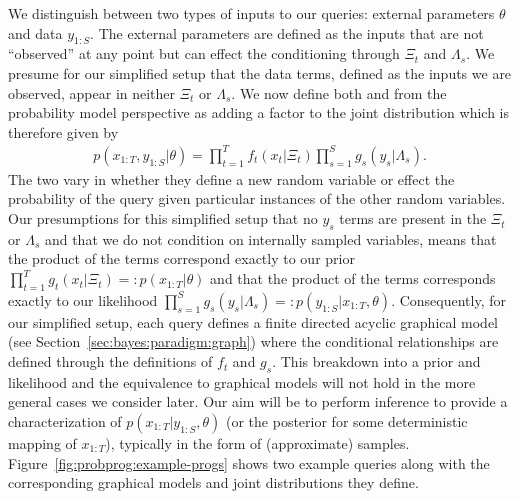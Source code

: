 We distinguish between two types of inputs to our queries: external parameters $\theta$ and data $y_{1:S}$.
The external parameters are defined as the inputs that are 
not ``observed'' at any point but can effect the conditioning through $\Xi_t$ and $\Lambda_s$.
We presume for our simplified setup that the data terms, defined as the inputs we are observed, 
appear in neither $\Xi_t$ or $\Lambda_s$.
We now define both \sample and \observe from the probability model perspective
as adding a factor to the joint distribution which is therefore given by
\begin{align}
\label{eq:probprog:simple-joint}
p(x_{1:T},y_{1:S} | \theta) = \prod_{t=1}^{T} f_t(x_t | \Xi_t) \prod_{s=1}^{S} g_s(y_s|\Lambda_s).
\end{align}
The two vary in whether they define a new random variable or effect the probability of the
query given particular instances of the other random variables.
Our presumptions for this simplified setup that no $y_{s}$ terms are present in the $\Xi_t$ or $\Lambda_s$
and that we do not condition on internally sampled variables, means that the product of the \sample terms
correspond exactly to our prior $\prod_{t=1}^{T} g_t(x_t | \Xi_t) =: p(x_{1:T} | \theta)$ and that the
product of the \observe terms corresponds exactly to our likelihood
$\prod_{s=1}^{S} g_s(y_s|\Lambda_s) =: p(y_{1:S} | x_{1:T}, \theta)$.  Consequently, for our simplified setup,
each query defines a finite directed acyclic graphical model (see Section~\ref{sec:bayes:paradigm:graph})
where the conditional relationships are defined through the definitions of $f_t$ and $g_s$.
This breakdown into a prior and likelihood and the equivalence to graphical models
will not hold in the more general cases we consider later.  Our aim will be to perform inference
to provide a characterization of $p(x_{1:T} | y_{1:S}, \theta)$ (or the posterior for some deterministic
mapping of $x_{1:T}$), typically in the form of (approximate)
samples.  Figure~\ref{fig:probprog:example-progs} shows two example queries
along with the corresponding graphical models and joint distributions they define.

